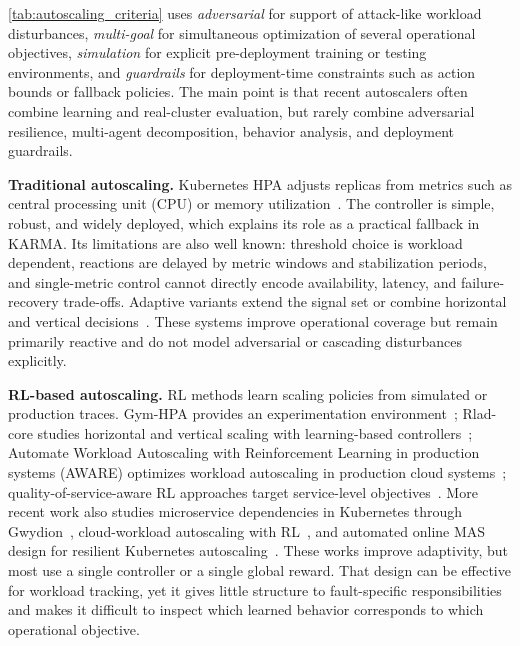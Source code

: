 \documentclass[journal]{IEEEtran}
\begin{document}
\autoref{tab:autoscaling_criteria} uses \emph{adversarial} for support of attack-like workload disturbances, \emph{multi-goal} for simultaneous optimization of several operational objectives, \emph{simulation} for explicit pre-deployment training or testing environments, and \emph{guardrails} for deployment-time constraints such as action bounds or fallback policies. The main point is that recent autoscalers often combine learning and real-cluster evaluation, but rarely combine adversarial resilience, multi-agent decomposition, behavior analysis, and deployment guardrails.

\textbf{Traditional autoscaling.} Kubernetes HPA adjusts replicas from metrics such as central processing unit (CPU) or memory utilization~\cite{Carrion2022}. The controller is simple, robust, and widely deployed, which explains its role as a practical fallback in KARMA. Its limitations are also well known: threshold choice is workload dependent, reactions are delayed by metric windows and stabilization periods, and single-metric control cannot directly encode availability, latency, and failure-recovery trade-offs. Adaptive variants extend the signal set or combine horizontal and vertical decisions~\cite{Zhou2024,KOSMOS,COPA}. These systems improve operational coverage but remain primarily reactive and do not model adversarial or cascading disturbances explicitly.

\textbf{RL-based autoscaling.} RL methods learn scaling policies from simulated or production traces. Gym-HPA provides an experimentation environment~\cite{gymhpa2022}; Rlad-core studies horizontal and vertical scaling with learning-based controllers~\cite{Rossi2019}; Automate Workload Autoscaling with Reinforcement Learning in production systems (AWARE) optimizes workload autoscaling in production cloud systems~\cite{aware2023}; quality-of-service-aware RL approaches target service-level objectives~\cite{QoSRL}. More recent work also studies microservice dependencies in Kubernetes through Gwydion~\cite{Santos2025Gwydion}, cloud-workload autoscaling with RL~\cite{Mishra2024CloudRL}, and automated online MAS design for resilient Kubernetes autoscaling~\cite{Soulée2025resilient}. These works improve adaptivity, but most use a single controller or a single global reward. That design can be effective for workload tracking, yet it gives little structure to fault-specific responsibilities and makes it difficult to inspect which learned behavior corresponds to which operational objective.
\end{document}
